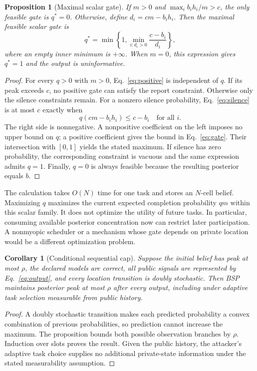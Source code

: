 \documentclass[3p,times]{elsarticle}
\newtheorem{proposition}{Proposition}
\newtheorem{corollary}{Corollary}
\begin{document}
\begin{proposition}[Maximal scalar gate]
If $m>0$ and $\max_i b_i h_i/m>c$, the only feasible gate is $q^*=0$. Otherwise, define $d_i=cm-b_i h_i$. Then the maximal feasible scalar gate is
\begin{equation}
 q^*=\min\left\{1,\min_{i:d_i>0}\frac{c-b_i}{d_i}\right\},
 \label{eq:gate}
\end{equation}
where an empty inner minimum is $+\infty$. When $m=0$, this expression gives $q^*=1$ and the output is uninformative.
\end{proposition}
\begin{proof}
For every $q>0$ with $m>0$, Eq.~\eqref{eq:positive} is independent of $q$. If its peak exceeds $c$, no positive gate can satisfy the report constraint. Otherwise only the silence constraints remain. For a nonzero silence probability, Eq.~\eqref{eq:silence} is at most $c$ exactly when
\begin{equation}
 q(cm-b_i h_i)\le c-b_i\quad\text{for all }i.
\end{equation}
The right side is nonnegative. A nonpositive coefficient on the left imposes no upper bound on $q$; a positive coefficient gives the bound in Eq.~\eqref{eq:gate}. Their intersection with $[0,1]$ yields the stated maximum. If silence has zero probability, the corresponding constraint is vacuous and the same expression admits $q=1$. Finally, $q=0$ is always feasible because the resulting posterior equals $b$.
\end{proof}

The calculation takes $O(N)$ time for one task and stores an $N$-cell belief. Maximizing $q$ maximizes the current expected completion probability $qm$ within this scalar family. It does not optimize the utility of future tasks. In particular, consuming available posterior concentration now can restrict later participation. A nonmyopic scheduler or a mechanism whose gate depends on private location would be a different optimization problem.

\begin{corollary}[Conditional sequential cap]
Suppose the initial belief has peak at most $\rho$, the declared models are correct, all public signals are represented by Eq.~\eqref{eq:output}, and every location transition is doubly stochastic. Then BSP maintains posterior peak at most $\rho$ after every output, including under adaptive task selection measurable from public history.
\end{corollary}
\begin{proof}
A doubly stochastic transition makes each predicted probability a convex combination of previous probabilities, so prediction cannot increase the maximum. The proposition bounds both possible observation branches by $\rho$. Induction over slots proves the result. Given the public history, the attacker's adaptive task choice supplies no additional private-state information under the stated measurability assumption.
\end{proof}
\end{document}
